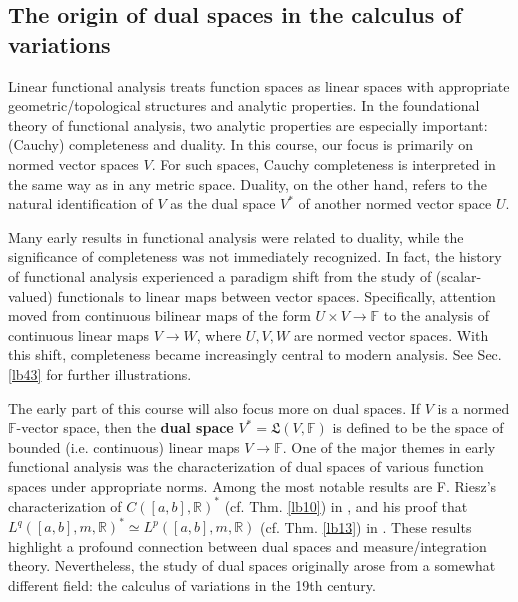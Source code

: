\documentclass[12pt,b5paper,notitlepage]{article}
\theoremstyle{definition}
\theoremstyle{plain}
\newcommand{\fk}{\mathfrak}
\newcommand{\Rbb}{\mathbb R}
\newcommand{\Fbb}{\mathbb F}
\numberwithin{equation}{section}
\begin{document}
\subsection{The origin of dual spaces in the calculus of variations}\label{lb24}



Linear functional analysis treats function spaces as linear spaces with appropriate geometric/topological structures and analytic properties. In the foundational theory of functional analysis, two analytic properties are especially important: (Cauchy) completeness and duality. In this course, our focus is primarily on normed vector spaces $V$. For such spaces, Cauchy completeness is interpreted in the same way as in any metric space. Duality, on the other hand, refers to the natural identification of $V$ as the dual space $V^*$ of another normed vector space $U$.



Many early results in functional analysis were related to duality, while the significance of completeness was not immediately recognized. In fact, the history of functional analysis experienced a paradigm shift from the study of (scalar-valued) functionals to linear maps between vector spaces. Specifically, attention moved from continuous bilinear maps of the form $U \times V \rightarrow \mathbb{F}$ to the analysis of continuous linear maps $V \rightarrow W$, where $U,V,W$ are normed vector spaces. With this shift, completeness became increasingly central to modern analysis. See Sec. \ref{lb43} for further illustrations.




The early part of this course will also focus more on dual spaces. If $V$ is a normed $\Fbb$-vector space, then the \textbf{dual space} $V^*=\fk L(V,\Fbb)$ is defined to be the space of bounded (i.e. continuous) linear maps $V\rightarrow\Fbb$. One of the major themes in early functional analysis was the characterization of dual spaces of various function spaces under appropriate norms. Among the most notable results are F. Riesz's characterization of $C([a,b], \Rbb)^*$ (cf. Thm. \ref{lb10}) in \cite{Rie09, Rie11}, and his proof that $L^q([a,b],m, \Rbb)^* \simeq L^p([a,b],m, \Rbb)$ (cf. Thm. \ref{lb13}) in \cite{Rie10}. These results highlight a profound connection between dual spaces and measure/integration theory. Nevertheless, the study of dual spaces originally arose from a somewhat different field: the calculus of variations in the 19th century.
\end{document}
